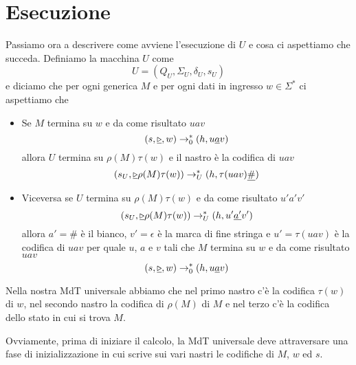 \section{Esecuzione}
Passiamo ora a descrivere come avviene l'esecuzione di $U$ e
cosa ci aspettiamo che succeda. Definiamo la macchina $U$ come
\[ U = (Q_U, \Sigma_U, \delta_U, s_U) \]
e diciamo che per ogni generica $M$ e per ogni dati in ingresso
$w \in \Sigma^*$ ci aspettiamo che
\begin{itemize}
	\item Se $M$ termina su $w$ e da come risultato $uav$
	      \[
		      (s, \underline{\triangleright}, w) \rightarrow^*_0
		      (h, u \underline{a} v)
	      \]
	      allora $U$ termina su $\rho(M) \tau(w)$ e il nastro è
	      la codifica di $uav$
	      \[
		      (s_U, \underline{\triangleright} \rho(M) \tau(w))
		      \rightarrow^*_U (h, \tau(uav) \underline{\#})
	      \]
	\item Viceversa se $U$ termina su $\rho(M) \tau(w)$ e da come
	      risultato $u'a'v'$
	      \[
		      (s_U, \underline{\triangleright} \rho(M) \tau(w))
		      \rightarrow^*_U (h, u' \underline{a'}v')
	      \]
	      allora $a' = \#$ è il bianco, $v' = \epsilon$ è la
	      marca di fine stringa e $u' = \tau(uav)$ è la codifica
	      di $uav$ per quale $u$, $a$ e $v$ tali che $M$ termina
	      su $w$ e da come risultato $uav$
	      \[
		      (s, \underline{\triangleright}, w) \rightarrow^*_0
		      (h, u \underline{a} v)
	      \]
\end{itemize}
Nella nostra MdT universale abbiamo che nel primo nastro c'è la
codifica $\tau(w)$ di $w$, nel secondo nastro la codifica di
$\rho(M)$ di $M$ e nel terzo c'è la codifica dello stato in cui
si trova $M$.

Ovviamente, prima di iniziare il calcolo, la MdT universale deve
attraversare una fase di inizializzazione in cui scrive sui vari
nastri le codifiche di $M$, $w$ ed $s$.


